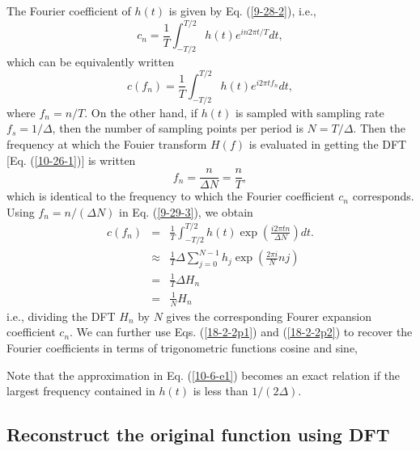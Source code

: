 \documentclass{article}
\begin{document}
The Fourier coefficient of $h (t)$ is given by Eq. (\ref{9-28-2}), i.e.,
\begin{equation}
  c_n = \frac{1}{T} \int_{- T / 2}^{T / 2} h (t) e^{i n 2 \pi t / T} d t,
\end{equation}
which can be equivalently written
\begin{equation}
  \label{9-29-3} c (f_n) = \frac{1}{T} \int_{- T / 2}^{T / 2} h (t) e^{i 2 \pi
  t f_n} d t,
\end{equation}
where $f_n = n / T$. On the other hand, if $h (t)$ is sampled with sampling
rate $f_s = 1 / \Delta$, then the number of sampling points per period is $N =
T / \Delta$. Then the frequency at which the Fouier transform $H (f)$ is
evaluated in getting the DFT [Eq. (\ref{10-26-1})] is written
\begin{equation}
  f_n = \frac{n}{\Delta N} = \frac{n}{T},
\end{equation}
which is identical to the frequency to which the Fourier coefficient $c_n$
corresponds. Using $f_n = n / (\Delta N)$ in Eq. (\ref{9-29-3}), we obtain
\begin{eqnarray}
  c (f_n) & = & \frac{1}{T} \int_{- T / 2}^{T / 2} h (t) \exp \left( \frac{i 2
  \pi t n}{\Delta N} \right) d t. \nonumber\\
  & \approx & \frac{1}{T} \Delta \sum_{j = 0}^{N - 1} h_j \exp \left( \frac{2
  \pi i}{N} n j \right)  \label{10-6-e1}\\
  & = & \frac{1}{T} \Delta H_n \nonumber\\
  & = & \frac{1}{N} H_n 
\end{eqnarray}
i.e., dividing the DFT $H_n$ by $N$ gives the corresponding Fourer expansion
coefficient $c_n$. We can further use Eqs. (\ref{18-2-2p1}) and
(\ref{18-2-2p2}) to recover the Fourier coefficients in terms of trigonometric
functions cosine and sine,

Note that the approximation in Eq. (\ref{10-6-e1}) becomes an exact relation
if the largest frequency contained in $h (t)$ is less than $1 / (2 \Delta)$.

\subsection{Reconstruct the original function using DFT}
\end{document}
